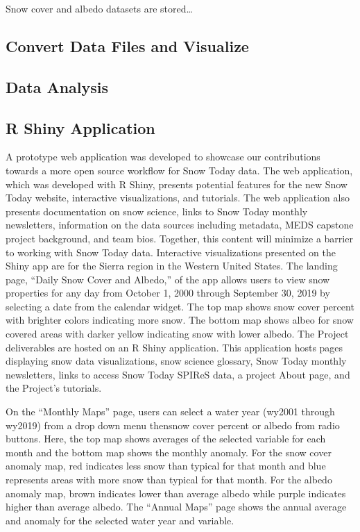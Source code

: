 \documentclass[
]{book}
\begin{document}
Snow cover and albedo datasets are stored\ldots{}

\hypertarget{convert-data-files-and-visualize}{%
\subsection{Convert Data Files and Visualize}\label{convert-data-files-and-visualize}}

\hypertarget{data-analysis}{%
\subsection{Data Analysis}\label{data-analysis}}

\hypertarget{r-shiny-application}{%
\subsection{R Shiny Application}\label{r-shiny-application}}

A prototype web application was developed to showcase our contributions towards a more open source workflow for Snow Today data. The web application, which was developed with R Shiny, presents potential features for the new Snow Today website, interactive visualizations, and tutorials. The web application also presents documentation on snow science, links to Snow Today monthly newsletters, information on the data sources including metadata, MEDS capstone project background, and team bios. Together, this content will minimize a barrier to working with Snow Today data.
Interactive visualizations presented on the Shiny app are for the Sierra region in the Western United States. The landing page, ``Daily Snow Cover and Albedo,'' of the app allows users to view snow properties for any day from October 1, 2000 through September 30, 2019 by selecting a date from the calendar widget. The top map shows snow cover percent with brighter colors indicating more snow. The bottom map shows albeo for snow covered areas with darker yellow indicating snow with lower albedo.
The Project deliverables are hosted on an R Shiny application. This application hosts pages displaying snow data visualizations, snow science glossary, Snow Today monthly newsletters, links to access Snow Today SPIReS data, a project About page, and the Project's tutorials.

On the ``Monthly Maps'' page, users can select a water year (wy2001 through wy2019) from a drop down menu thensnow cover percent or albedo from radio buttons. Here, the top map shows averages of the selected variable for each month and the bottom map shows the monthly anomaly. For the snow cover anomaly map, red indicates less snow than typical for that month and blue represents areas with more snow than typical for that month. For the albedo anomaly map, brown indicates lower than average albedo while purple indicates higher than average albedo. The ``Annual Maps'' page shows the annual average and anomaly for the selected water year and variable.
\end{document}
